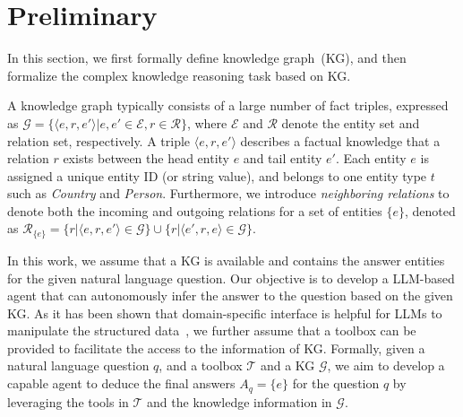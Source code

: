 \section{Preliminary}
\label{preliminary}

In this section, we first formally define knowledge graph~(KG), and then formalize the complex knowledge reasoning task based on KG.

A knowledge graph typically consists of a large number of fact triples, expressed as $\mathcal{G} = \{\langle e,r,e' \rangle| e,e' \in \mathcal{E}, r \in \mathcal{R}\}$, where $\mathcal{E}$ and $\mathcal{R}$ denote the entity set and relation set, respectively.
A triple $\langle e,r,e' \rangle$ describes a factual knowledge that a relation $r$ exists between the head entity $e$ and tail entity $e'$. 
Each entity $e$ is assigned a unique entity ID (or string value), and belongs to one entity type $t$ such as \emph{Country} and \emph{Person}.  
Furthermore, we introduce \emph{neighboring relations} to denote both the incoming and outgoing relations for a set of entities $\{e\}$, denoted as $\mathcal{R}_{\{e\}} = \{r | \langle e, r, e' \rangle \in \mathcal{G}\} \cup \{r | \langle e', r, e \rangle \in \mathcal{G} \}$.

In this work, we assume that a KG is available and contains the answer entities for the given natural language question.
Our objective is to develop a LLM-based agent that can autonomously infer the answer to the question based on the given KG. 
As it has been shown that domain-specific interface is helpful for LLMs to manipulate the structured data~\cite{Jiang-2023-arxiv-StructGPT}, we further assume that a toolbox can be provided to facilitate the access to the information of KG. 
Formally, given a natural language question $q$, and a toolbox $\mathcal{T}$ and a KG $\mathcal{G}$, we aim to develop a capable agent to deduce the final answers $A_q=\{e\}$ for the question $q$ by leveraging the tools in $\mathcal{T}$ and the knowledge information in $\mathcal{G}$.